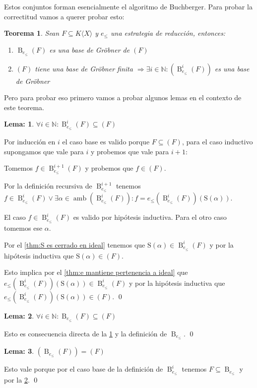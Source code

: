 \documentclass{amsbook} %
\theoremstyle{customstyle}
\newtheorem{theorem}{Teorema}[chapter]
\newtheorem{lemma}{Lema:}[chapter]
\renewenvironment{proof}[1][\proofname]{{\bfseries #1: }}{\qed} %
\theoremstyle{factstyle}
\DeclareMathOperator{\amb}{amb}
\renewcommand{\S}{\text{S}}
\DeclareMathOperator{\B}{B}
\begin{document}
Estos conjuntos forman esencialmente el algoritmo de Buchberger. Para probar la correctitud vamos a querer probar esto:

\begin{theorem}\label{thm:Buchberger correctitud}
Sean $F ⊆ K⟨X⟩$ y $e_≤$ una estrategia de reducción, entonces:
\begin{enumerate}
\item $\B_{e_≤}(F)$ es una base de Gröbner de $(F)$
\item $(F)$ tiene una base de Gröbner finita $⇒ ∃i ∈ ℕ : (\B_{e_≤}^i(F))$ es una base de Gröbner
\end{enumerate}
\end{theorem}

Pero para probar eso primero vamos a probar algunos lemas en el contexto de este teorema.

\begin{lemma}\label{lemma:Buchberger correctitud:3}
$∀i ∈ ℕ : \B_{e_≤}^{i}(F) ⊆ (F)$
\end{lemma}
\begin{proof}
Por inducción en $i$ el caso base es valido porque $F ⊆ (F)$, para el caso inductivo supongamos que vale para $i$ y probemos que vale para $i + 1$:

Tomemos $f ∈ \B_{e_≤}^{i + 1}(F)$ y probemos que $f ∈ (F)$.

Por la definición recursiva de $\B_{e_≤}^{i + 1}$ tenemos $f ∈ \B_{e_≤}^i(F) ∨ ∃α ∈ \amb(\B_{e_≤}^i(F)) : f = e_≤(\B_{e_≤}^i(F))(\S(α))$.

El caso $f ∈ \B_{e_≤}^i(F)$ es valido por hipótesis inductiva. Para el otro caso tomemos ese $α$.

Por el \cref{thm:S es cerrado en ideal} tenemos que $\S(α) ∈ \B_{e_≤}^i(F)$ y por la hipótesis inductiva que $\S(α) ∈ (F)$.

Esto implica por el \cref{thm:e mantiene pertenencia a ideal} que $e_≤(\B_{e_≤}^i(F))(\S(α)) ∈ \B_{e_≤}^i(F)$ y por la hipótesis inductiva que $e_≤(\B_{e_≤}^i(F))(\S(α)) ∈ (F)$.
\end{proof}

\begin{lemma}\label{lemma:Buchberger correctitud:4}
$∀i ∈ ℕ : \B_{e_≤}(F) ⊆ (F)$
\end{lemma}
\begin{proof}
Esto es consecuencia directa de la \cref{lemma:Buchberger correctitud:3} y la definición de $\B_{e_≤}$.
\end{proof}

\begin{lemma}\label{lemma:Buchberger correctitud:5}
$(\B_{e_≤}(F)) = (F)$
\end{lemma}
\begin{proof}
Esto vale porque por el caso base de la definición de $\B_{e_≤}^i$ tenemos $F ⊆ \B_{e_≤}$ y por la \cref{lemma:Buchberger correctitud:4}.
\end{proof}
\end{document}
